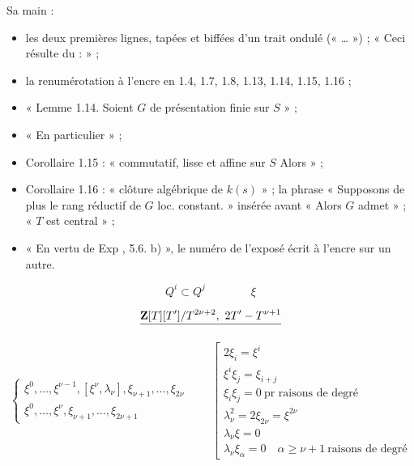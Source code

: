 \documentclass[11pt,a4paper]{article}
\begin{document}
Sa main :
\begin{itemize}
  \item les deux premières lignes, tapées et biffées d'un trait ondulé
  («  … ») ;
  « Ceci résulte du  : » ;
  \item la renumérotation à l'encre en 1.4, 1.7, 1.8, 1.13, 1.14, 1.15, 1.16 ;
  \item « Lemme 1.14. Soient $G$   de présentation finie sur $S$ » ;
  \item « En particulier » ;
  \item Corollaire 1.15 : « commutatif, lisse et affine sur $S$ Alors » ;
  \item Corollaire 1.16 : « clôture algébrique  de $k(s)$ » ; la phrase
  « Supposons de plus le rang réductif de $G$ loc. constant. » insérée avant
  « Alors $G$ admet » ; «  $T$ est central » ;
  \item « En vertu de Exp , 5.6. b) », le numéro de l'exposé écrit à
  l'encre sur un autre.
\end{itemize}


\[
  Q^i \subset Q^j \qquad\qquad \xi
\]

\[
  \struck{\mathbf{Z}[T][T'] / T^{2\nu+2},\ 2T' - T^{\nu+1}}
\]

\[
  \left\{
  \begin{array}{l}
    \xi^0, \ldots, \xi^{\nu-1}, [\xi^{\nu}, \lambda_{\nu}], \xi_{\nu+1}, \ldots, \xi_{2\nu} \\
    \xi^0, \ldots, \xi^{\nu}, \xi_{\nu+1}, \ldots, \xi_{2\nu+1}
  \end{array}
  \right.
  \qquad
  \left[
  \begin{array}{l}
    2\xi_i = \xi^i \\
    \xi^i \xi_j = \xi_{i+j} \\
    \xi_i \xi_j = 0 \ \text{pr raisons de degré} \\
    \lambda_{\nu}^2 = 2\xi_{2\nu} = \xi^{2\nu} \\
    \lambda_{\nu} \xi = 0 \\
    \lambda_{\nu} \xi_{\alpha} = 0 \quad \alpha \geqslant \nu+1 \ \text{raisons de degré}
  \end{array}
  \right.
\]
\end{document}
